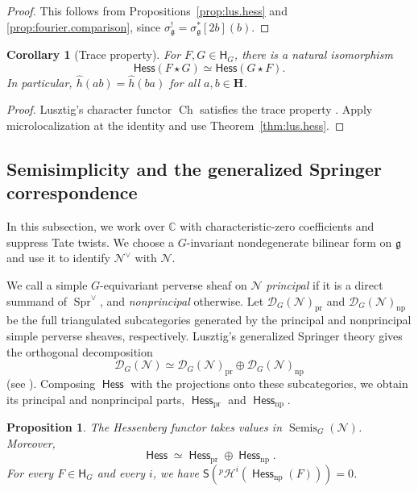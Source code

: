 \documentclass[11pt]{amsart}
\numberwithin{equation}{section}
\newtheorem{corollary}[theorem]{Corollary}
\newtheorem{proposition}[theorem]{Proposition}
\theoremstyle{definition}
\newcommand\hecke{\mathbf{H}}  %
\DeclareMathOperator{\Semis}{Semis}
\def\cH{\mathcal {H}}
\DeclareMathOperator{\Hess}{\mathsf{Hess}}
\def\C{\mathbb{C}}
\def\fg{\mathfrak {g}}
\DeclareMathOperator{\Ch}{\mathrm{Ch}}
\DeclareMathOperator{\Spr}{\mathrm{Spr}}
\begin{document}
\begin{proof}
This follows from Propositions~\ref{prop:lus.hess} and \ref{prop:fourier.comparison}, since $\sigma_\fg^!=\sigma_\fg^*[2b](b)$.
\end{proof}

\begin{corollary}[Trace property]\label{cor:trace}
For $F,G\in\mathsf H_G$, there is a natural isomorphism
\[\mathsf{Hess}(F\star G)\simeq \mathsf{Hess}(G\star F).\]
In particular, $\widehat h(ab)=\widehat h(ba)$ for all $a,b\in\hecke$.
\end{corollary}

\begin{proof}
Lusztig's character functor $\Ch$ satisfies the trace property \cite[Lemma~2.7.1]{trinh2021heckecategoryunipotentlocus}. Apply microlocalization at the identity and use Theorem~\ref{thm:lus.hess}.
\end{proof}



\subsection{Semisimplicity and the generalized Springer correspondence}
\label{ss:Hess.blocks}

In this subsection, we work over $\C$ with characteristic-zero coefficients and suppress Tate twists.
We choose a $G$-invariant nondegenerate bilinear form on $\fg$ and use it to identify $\mathcal N^\vee$ with $\mathcal N$.

We call a simple $G$-equivariant perverse sheaf on $\mathcal N$ \emph{principal} if it is a direct summand of $\Spr^\vee$, and \emph{nonprincipal} otherwise.
Let $\mathscr D_G(\mathcal N)_{\mathrm{pr}}$ and $\mathscr D_G(\mathcal N)_{\mathrm{np}}$ be the full triangulated subcategories generated by the principal and nonprincipal simple perverse sheaves, respectively.
Lusztig's generalized Springer theory gives the orthogonal decomposition
\[
\mathscr D_G(\mathcal N)\simeq
\mathscr D_G(\mathcal N)_{\mathrm{pr}}
\oplus\mathscr D_G(\mathcal N)_{\mathrm{np}}
\]
(see \cite[Theorem~3.5]{rider-russell}).
Composing $\Hess$ with the projections onto these subcategories, we obtain its principal and nonprincipal parts, $\Hess_{\mathrm{pr}}$ and $\Hess_{\mathrm{np}}$.

\begin{proposition}\label{prop:Hess.semisimple}\label{cor:Hess.blocks}
The Hessenberg functor takes values in $\Semis_G(\mathcal N)$. Moreover, 
\begin{equation}\label{eq:Hess.blocks}
\Hess\simeq\Hess_{\mathrm{pr}}\oplus\Hess_{\mathrm{np}}.
\end{equation}
For every $F\in\mathsf H_G$ and every $i$, we have
$\mathsf S({}^p\cH^i(\Hess_{\mathrm{np}}(F)))=0$.
\end{proposition}
\end{document}
